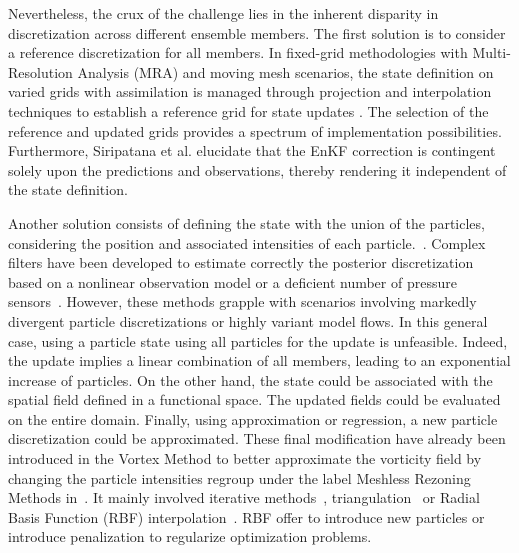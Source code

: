 Nevertheless, the crux of the challenge lies in the inherent disparity in discretization across different ensemble members. The first solution is to consider a reference discretization for all members. In fixed-grid methodologies with Multi-Resolution Analysis (MRA) and moving mesh scenarios, the state definition on varied grids with assimilation is managed through projection and interpolation techniques to establish a reference grid for state updates \cite{siripatana_combining_2019,bonan_data_2017}. The selection of the reference and updated grids provides a spectrum of implementation possibilities. Furthermore, Siripatana et al. \cite{siripatana_combining_2019} elucidate that the EnKF correction is contingent solely upon the predictions and observations, thereby rendering it independent of the state definition.

Another solution consists of defining the state with the union of the particles, considering the position and associated intensities of each particle.~\cite{darakananda_data-assimilated_2018}. Complex filters have been developed to estimate correctly the posterior discretization based on a nonlinear observation model or a deficient number of pressure sensors~\cite{le_provost_low-rank_2021}.
However, these methods grapple with scenarios involving markedly divergent particle discretizations or highly variant model flows. In this general case, using a particle state using all particles for the update is unfeasible. Indeed, the update implies a linear combination of all members, leading to an exponential increase of particles.
On the other hand, the state could be associated with the spatial field defined in a functional space. The updated fields could be evaluated on the entire domain. Finally, using approximation or regression, a new particle discretization could be approximated. These final modification have already been introduced in the Vortex Method to better approximate the vorticity field by changing the particle intensities regroup under the label Meshless Rezoning Methods in~\cite{mimeau_review_2021}. It mainly involved iterative methods~\cite{beale_accuracy_1988},  triangulation~\cite{russo_1994} or Radial Basis Function (RBF) interpolation~\cite{barba_lorena_a_vortex_2004,sperotto_2021}. RBF offer to introduce new particles or introduce penalization to regularize optimization problems.\newline

